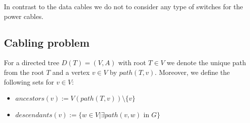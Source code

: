 In contrast to the data cables we do not to consider any type of switches for the power cables.

\subsection{Cabling problem}
For a directed tree $D(T)=(V,A)$ with root $T\in V$ we denote the unique path from the root $T$ and a vertex $v\in V$ by $path(T,v)$. Moreover, we define the following sets for $v\in V$:
\begin{itemize}
  \item $ancestors(v) := V(path(T,v))\setminus\{v\}$
  \item $descendants(v) := \{w\in V | \exists path(v,w)\text{ in } G\}$
\end{itemize}
\newcommand*{\treeData}{B_{\text{data}}}
\newcommand*{\treePower}{B_{\text{power}}}
\newcommand*{\assignData}{assign_{\text{data}}}
\newcommand*{\assignPower}{assign_{\text{power}}}
\newcommand*{\assignSwitch}{assign_{\text{lcu}}}
